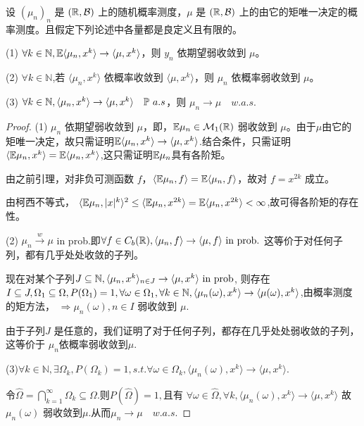 \begin{theorem}
     设 \((\mu_n)_n\) 是 \((\mathbb{R}, \mathcal{B})\) 上的随机概率测度，\(\mu\) 是 \((\mathbb{R}, \mathcal{B})\) 上的由它的矩唯一决定的概率测度。且假定下列论述中各量都是良定义且有限的。

(1) \(\forall k \in \mathbb{N}, \mathbb{E} \langle \mu_n, x^k \rangle \to \langle \mu, x^k \rangle\)，则 \(y_n\) 依期望弱收敛到 \(\mu\)。

(2) \(\forall k \in \mathbb{N}\),若 \(\langle \mu_n, x^k \rangle\) 依概率收敛到 \(\langle \mu, x^k \rangle\)，则 \(\mu_n\) 依概率弱收敛到 \(\mu\)。

(3) \(\forall k \in \mathbb{N}, \langle \mu_n, x^k \rangle \to \langle \mu, x^k \rangle \quad \prob\ a.s\)，则 \(\mu_n \to \mu \quad w.a.s.\)
\end{theorem}
\begin{proof}
    (1) \(\mu_n\) 依期望弱收敛到 \(\mu\)，即，\(\mathbb{E} \mu_n \in \mathcal{M}_1(\mathbb{R})\) 弱收敛到 \(\mu\)。由于$\mu$由它的矩唯一决定，故只需证明\( \mathbb{E} \langle \mu_n, x^k \rangle \to \langle \mu, x^k \rangle\).结合条件，只需证明\(\langle \mathbb{E} \mu_n, x^k \rangle = \mathbb{E} \langle \mu_n, x^k \rangle\),这只需证明$\mathbb{E}\mu_n$具有各阶矩。
    
由之前引理，对非负可测函数 \(f\)，\(\langle \mathbb{E} \mu_n, f \rangle = \mathbb{E} \langle \mu_n, f \rangle\)，故对 \(f = x^{2k}\) 成立。

由柯西不等式， \(\langle \mathbb{E} \mu_n, |x|^k \rangle^2 \leq \langle \mathbb{E} \mu_n, x^{2k} \rangle = \mathbb{E} \langle \mu_n, x^{2k} \rangle < \infty\),故可得各阶矩的存在性。

(2) \(\mu_n \overset{w}{\to} \mu\) in prob.即\(\forall f \in C_b (\mathbb{R}), \langle\mu_n, f \rangle \to \langle \mu, f \rangle \text{ in prob}.\)
这等价于对任何子列，都有几乎处处收敛的子列。

现在对某个子列$J \subseteq \mathbb{N},\langle \mu_n, x^k \rangle_{n \in J} \to \langle \mu, x^k \rangle \text{ in prob}$,
则存在$I \subseteq J, \Omega_1 \subseteq \Omega, P(\Omega_1) = 1,\forall \omega \in \Omega_1, \forall k \in \mathbb{N}, \langle \mu_n(\omega), x^k \rangle \to \langle\mu(\omega), x^k \rangle$,由概率测度的矩方法，
\(\Rightarrow \mu_n(\omega), n \in I \text{ 弱收敛到 } \mu.\)

由于子列$J$ 是任意的，我们证明了对于任何子列，都存在几乎处处弱收敛的子列，这等价于 $\mu_n$依概率弱收敛到$μ$.

(3)\( \forall k \in \mathbb{N}, \exists \Omega_k, P(\Omega_k) = 1, s.t. \forall \omega \in \Omega_k, \langle \mu_n(\omega), x^k \rangle \to \langle \mu, x^k \rangle \).

令\(\hat{\Omega} = \bigcap_{k=1}^{\infty} \Omega_k \subseteq \Omega.\)则\(P(\hat{\Omega}) = 1,\)且有
\(\forall \omega \in \hat{\Omega},\forall k, \langle \mu_n(\omega), x^k \rangle \to \langle \mu, x^k \rangle\)
故$\mu_n(\omega)$  弱收敛到$  \mu$.从而$\mu_n \to \mu \quad w.a.s.$
\end{proof}

